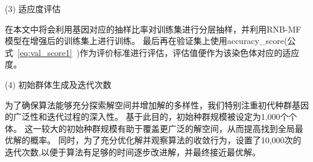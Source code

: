 (3) 适应度评估\par
在本文中将会利用基因对应的抽样比率对训练集进行分层抽样，并利用RNB-MF模型在增强后的训练集上进行训练。
最后再在验证集上使用accuracy\_score(公式~\ref{eq:val_score1}~)作为评价标准进行评估，评估值便作为该染色体对应的适应度。\par

(4) 初始群体生成及迭代次数\par
为了确保算法能够充分探索解空间并增加解的多样性，我们特别注重初代种群基因的广泛性和迭代过程的深入性。
基于此目的，初始种群规模被设定为1,000个个体。
这一较大的初始种群规模有助于覆盖更广泛的解空间，从而提高找到全局最优解的概率。
同时，为了充分优化解并观察算法的收敛行为，设置了10,000次的迭代次数,以便于算法有足够的时间逐步改进解，并最终接近最优解。\par


